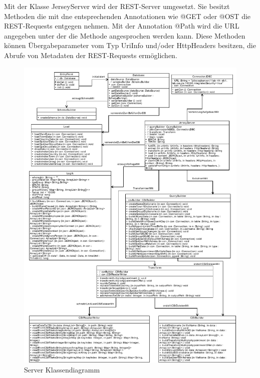 Mit der Klasse JerseyServer wird der REST-Server umgesetzt. Sie besitzt Methoden die mit dne entsprechenden Annotationen wie @GET oder @OST die REST-Requests entgegen nehmen. Mit der Annotation @Path wird die URL angegeben unter der die Methode angesprochen werden kann. Diese Methoden können Übergabeparameter vom Typ UriInfo und/oder HttpHeaders besitzen, die Abrufe von Metadaten der REST-Requests ermöglichen. 

\begin{figure}[htbp]
\begin{center}
\includegraphics[width=1.0\textwidth]{pics/ServerKlassendiagramm.pdf}
\caption{Server Klassendiagramm}
\label{umsetzung_klassendiagramm_server}
\end{center}
\end{figure}

